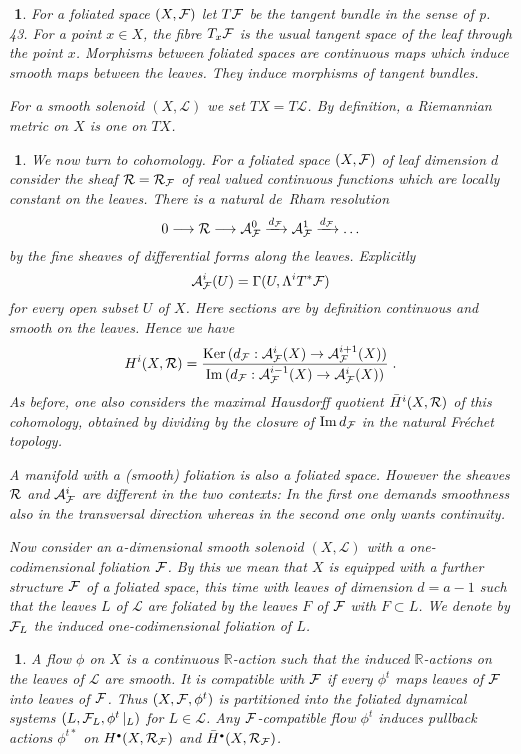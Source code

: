 \documentclass[11pt,leqno]{article}
\newcommand{\R}{{\mathbb{R}}}
\newcommand{\Imm}{\mathrm{Im}\,}
\newcommand{\Ker}{\mathrm{Ker}\,}
\newcommand{\Ah}{{\cal A}}
\newcommand{\Fh}{{\cal F}}
\newcommand{\Lh}{{\mathcal L}}
\newcommand{\Rh}{{\cal R}}
\newcommand{\oH}{\bar{H}}
\newcommand{\hullet}{{\scriptscriptstyle \bullet}}
\newtheorem{punkt}[theorem]{$\!\!$}
\begin{document}
\begin{punkt}
For a foliated space $(X, \Fh)$ let $T\Fh$ be the tangent bundle in the sense of \cite{MS} p. 43. For a point $x \in X$, the fibre $T_x \Fh$ is the usual tangent space of the leaf through the point $x$. Morphisms between foliated spaces are continuous maps which induce smooth maps between the leaves. They induce morphisms of tangent bundles.

For a smooth solenoid $(X, \Lh)$ we set $TX = T\Lh$. By definition, a Riemannian metric on $X$ is one on $TX$.
\end{punkt}

\begin{punkt} \label{t12}
\rm We now turn to cohomology. For a foliated space $(X,\Fh)$ of leaf dimension $d$ consider the sheaf $\Rh = \Rh_{\Fh}$ of real valued continuous functions which are locally constant on the leaves. There is a natural de~Rham resolution 
\[
0 \longrightarrow \Rh \longrightarrow \Ah^0_{\Fh} \xrightarrow{d_{\Fh}} \Ah^1_{\Fh} \xrightarrow{d_{\Fh}} \ldots
\]
by the fine sheaves of differential forms along the leaves. Explicitly
\[
\Ah^i_{\Fh} (U) = \Gamma (U , \Lambda^i T^* \Fh)
\]
for every open subset $U$ of $X$. Here sections are by definition continuous and smooth on the leaves. Hence we have
\[
H^i (X, \Rh) = \frac{\Ker (d_{\Fh} : \Ah^i_{\Fh} (X) \to \Ah^{i+1}_{\Fh} (X))}{\Imm (d_{\Fh} : \Ah^{i-1}_{\Fh} (X) \to \Ah^i_{\Fh} (X))} \; .
\]
As before, one also considers the maximal Hausdorff quotient $\oH^i (X,\Rh)$ of this cohomology, obtained by dividing by the closure of $\Imm d_{\Fh}$ in the natural Fr\'echet topology.
\bigskip

 A manifold with a (smooth) foliation is also a foliated space. However the sheaves $\Rh$ and $\Ah^i_{\Fh}$ are different in the two contexts: In the first one demands smoothness also in the transversal direction whereas in the second one only wants continuity.
\bigskip

Now consider an $a$-dimensional smooth solenoid $(X, \Lh)$ with a one-codi\-mensional foliation $\Fh$. By this we mean that $X$ is equipped with a further structure $\Fh$ of a foliated space, this time with leaves of dimension $d = a-1$ such that the leaves $L$ of $\Lh$ are foliated by the leaves $F$ of $\Fh$ with $F \subset L$. We denote by $\Fh_L$ the induced one-codimensional foliation of $L$.
\end{punkt}

\begin{punkt}
  \label{t14} \rm
A flow $\phi$ on $X$ is a continuous $\R$-action such that the induced $\R$-actions on the leaves of $\Lh$ are smooth. It is compatible with $\Fh$ if every $\phi^t$ maps leaves of $\Fh$ into leaves of $\Fh$. Thus $(X , \Fh , \phi^t)$ is partitioned into the foliated dynamical systems $(L, \Fh_L , \phi^t \, |_L)$ for $L \in \Lh$. Any $\Fh$-compatible flow $\phi^t$ induces pullback actions $\phi^{t*}$ on $H^{\hullet} (X, \Rh_{\Fh})$ and $\oH^{\hullet} (X, \Rh_{\Fh})$.
\end{punkt}
\end{document}
